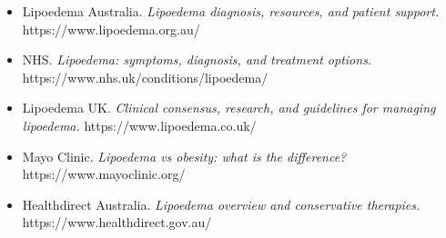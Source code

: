 \begin{itemize}
    \item Lipoedema Australia. \textit{Lipoedema diagnosis, resources, and patient support.} https://www.lipoedema.org.au/
    \item NHS. \textit{Lipoedema: symptoms, diagnosis, and treatment options.} https://www.nhs.uk/conditions/lipoedema/
    \item Lipoedema UK. \textit{Clinical consensus, research, and guidelines for managing lipoedema.} https://www.lipoedema.co.uk/
    \item Mayo Clinic. \textit{Lipoedema vs obesity: what is the difference?} https://www.mayoclinic.org/
    \item Healthdirect Australia. \textit{Lipoedema overview and conservative therapies.} https://www.healthdirect.gov.au/
\end{itemize}
